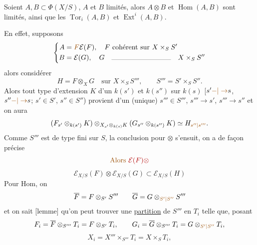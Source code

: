 Soient $A,B\subset\Phi(X/S)$, $A$ et $B$ limités, alors $A\otimes B$ et $\operatorname{Hom}(A,B)$ sont limités, ainsi que les $\operatorname{Tor}_i(A,B)$ et $\operatorname{Ext}^i(A,B)$.

En effet, supposons
\[
\left\{\begin{aligned}
A&=\deleted{\unsure{F}}\mathcal E(F),\quad F\text{ cohérent sur }X\times_S S'\\
B&=\mathcal E(G),\quad G\quad\rule{3cm}{.2pt}\quad X\times_S S''
\end{aligned}\right.
\]
 alors considérer
\[
H=F\otimes_XG\quad\text{sur }X\times_S S''',\qquad S'''=S'\times_S S''.
\]
Alors tout type d'extension  $K$ d'un $k(s')$ et $k(s'')$ sur $k(s)$ [$s'\unsure{-|\to}s$, $s''\unsure{-|\to}s$; $s'\in S'$, $s''\in S''$) provient d'un (unique) $s'''\in S'''$, $s'''\to s'$, $s'''\to s''$ et on aura
\[
(F_{s'}\otimes_{k(s')}K)\otimes_{X_{s'}\otimes_{k(s)}K}(G_{s''}\otimes_{k(s'')}K)\simeq H_{\unsure{s''|s'''}}.
\]
Comme $S'''$ est de type fini sur $S$, la conclusion pour $\otimes$ s'ensuit, on a de façon précise
\[
\deleted{\text{\unsure{Alors}}\ \mathcal E(F)\otimes}
\]
\[
\mathcal E_{X/S}(F)\otimes\mathcal E_{X/S}(G)\subset\mathcal E_{X/S}(H)
\]
Pour Hom, on  
\[
\overline F=F\otimes_{S'}S'''\qquad\overline G=G\otimes_{\unsure{S'|S''}}S'''
\]
et on sait [lemme] qu'on peut trouver une \uline{partition} de $S'''$ en  $T_i$ telle que, posant
\[
F_i=\overline F\otimes_{S'''}T_i=F\otimes_{S'}T_i,\qquad G_i=\overline G\otimes_{S'''}T_i=G\otimes_{\unsure{S'|S''}}T_i,
\]
\[
X_i=X'''\times_{S'''}T_i=X\times_S T_i,
\]
